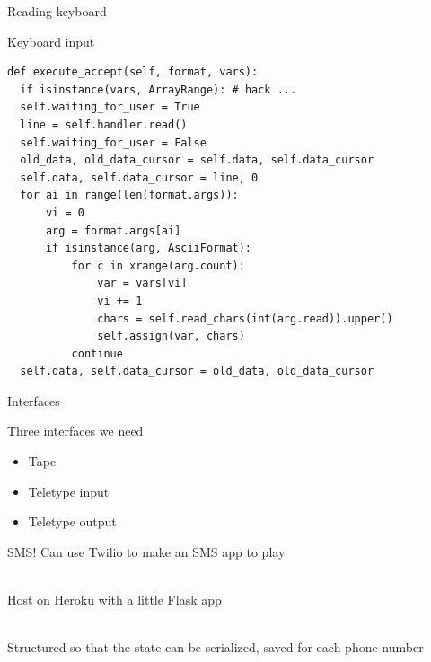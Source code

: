 \documentclass{beamer}
\def\py{
  \lstset{
     language=Python,
     extendedchars=true,
     basicstyle=\footnotesize\ttfamily,
     showstringspaces=false,
     showspaces=false,
     numbersep=9pt,
     tabsize=2,
     breaklines=true,
     showtabs=false,
     captionpos=b
  }
}
\begin{document}
\begin{frame}[fragile]{Reading keyboard}

\begin{block}{Keyboard input}
\py
\begin{lstlisting}
def execute_accept(self, format, vars):
  if isinstance(vars, ArrayRange): # hack ...
  self.waiting_for_user = True
  line = self.handler.read()
  self.waiting_for_user = False
  old_data, old_data_cursor = self.data, self.data_cursor
  self.data, self.data_cursor = line, 0
  for ai in range(len(format.args)):
      vi = 0
      arg = format.args[ai]
      if isinstance(arg, AsciiFormat):
          for c in xrange(arg.count):
              var = vars[vi]
              vi += 1
              chars = self.read_chars(int(arg.read)).upper()
              self.assign(var, chars)
          continue
  self.data, self.data_cursor = old_data, old_data_cursor
\end{lstlisting}
\end{block}
\end{frame}

\begin{frame}{Interfaces}

Three interfaces we need

\begin{itemize}
  \item Tape
  \item Teletype input
  \item Teletype output
\end{itemize}
\end{frame}
\begin{frame}{SMS!}
Can use Twilio to make an SMS app to play

\ \\

Host on Heroku with a little Flask app

\ \\

Structured so that the state can be serialized, saved for each phone number
\end{frame}
\end{document}
